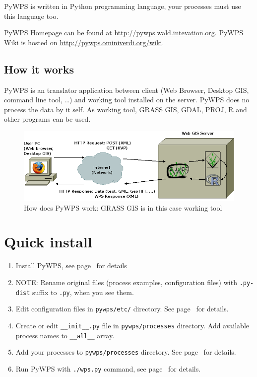 \documentclass[a4paper,11pt]{article}
\newcommand{\pywpssite}{\url{http://pywps.wald.intevation.org}}
\newcommand{\pywpswiki}{\url{http://pywps.ominiverdi.org/wiki}}
\begin{document}
PyWPS is written in Python programming language, your processes must use
this language too. 

PyWPS Homepage can be found at \pywpssite.
PyWPS Wiki is hosted on \pywpswiki. 

\subsection{How it works}
PyWPS is an translator application between client (Web Browser, Desktop
GIS, command line tool, \dots) and working tool installed on the server.
PyWPS does no process the data by it self. As working tool, GRASS GIS, GDAL, PROJ, R
and other programs can be used.

\begin{figure}[ht]
\begin{center}
\includegraphics[width=1\textwidth]{pic/pywps-schema}
\caption{How does PyWPS work: GRASS GIS is in this case working tool}
\label{pic:pywps}
\end{center}
\end{figure}

\section{Quick install}
\begin{enumerate}
    \item Install PyWPS, see page~\pageref{install} for details
    \item NOTE: Rename original files (process examples, configuration files)
    with \texttt{.py-dist} suffix to \texttt{.py}, when you see them.
    \item Edit configuration files in \texttt{pywps/etc/} directory. See
    page~\pageref{configuration} for details.
    \item Create or edit \texttt{\_\_init\_\_.py} file in
    \texttt{pywps/processes} directory. Add available process names to
    \texttt{\_\_all\_\_} array.
    \item Add your processes to \texttt{pywps/processes} directory. See
    page~\pageref{processes} for details.
    \item Run PyWPS with \texttt{./wps.py} command, see
    page~\pageref{testing} for details.
\end{enumerate}
\end{document}
